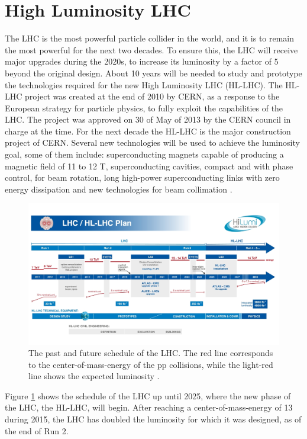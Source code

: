 \section{High Luminosity LHC}
The LHC is the most powerful particle collider in the world, and it is to remain the most powerful for the next two decades. To ensure this, the LHC will receive major upgrades during the 2020s, to increase its luminosity by a factor of 5 beyond the original design. About 10 years will be needed to study and prototype the technologies required for the new High Luminosity LHC (HL-LHC). The HL-LHC project was created at the end of  2010 by CERN, as a response to the  European strategy for particle physics, to fully exploit the capabilities of the LHC. The project was approved on 30 of May of 2013 by the CERN council in charge at the time. For the next decade the HL-LHC is the major construction project of CERN. Several new technologies will be used to achieve the luminosity goal, some of them include: superconducting magnets capable of producing a magnetic field of 11 to 12 T, superconducting  cavities, compact and with phase control, for beam rotation, long high-power superconducting links with zero energy dissipation and new technologies for beam collimation \cite{cern3}.
\begin{center}
\begin{figure}[H]
    \centering
    \includegraphics[scale=1.5]{Chapter2/schedulelhc.jpg}
    \caption[schedule of the LHC.]{The past and future schedule of the LHC. The red line corresponds to the center-of-mass-energy of the pp collisions, while the light-red line shows the expected luminosity \cite{schedule}.}
    \label{programing}
\end{figure}
\end{center}
Figure \ref{programing} shows the  schedule of the LHC up until 2025, where the new phase of the LHC, the HL-LHC, will  begin. After reaching a center-of-mass-energy of 13 during 2015, the LHC has doubled the luminosity for which it was designed, as  of the end of Run 2.

